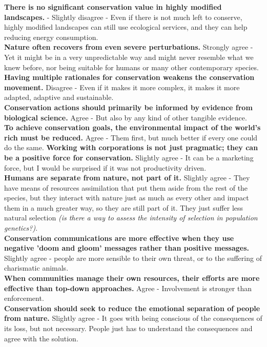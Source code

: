 \documentclass[12pt]{article}
\begin{document}
\textbf{There is no significant conservation value in highly modified landscapes.} - Slightly disagree - Even if there is not much left to conserve, highly modified landscapes can still use ecological services, and they can help reducing energy consumption.\\
\textbf{Nature often recovers from even severe perturbations.} Strongly agree - Yet it might be in a very unpredictable way and might never resemble what we knew before, nor being suitable for humans or many other contemporary species.\\
\textbf{Having multiple rationales for conservation weakens the conservation movement.} Disagree - Even if it makes it more complex, it makes it more adapted, adaptive and sustainable.\\
\textbf{Conservation actions should primarily be informed by evidence from biological science.} Agree - But also by any kind of other tangible evidence.\\
\textbf{To achieve conservation goals, the environmental impact of the world's rich must be reduced.} Agree - Them first, but much better if every one could do the same.
\textbf{Working with corporations is not just pragmatic; they can be a positive force for conservation.} Slightly agree - It can be a marketing force, but I would be surprised if it was not productivity driven.\\
\textbf{Humans are separate from nature, not part of it.} Slightly agree - They have means of resources assimilation that put them aside from the rest of the species, but they interact with nature just as much as every other and impact them in a much greater way, so they are still part of it. They just suffer less natural selection \textit{(is there a way to assess the intensity of selection in population genetics?)}.\\
\textbf{Conservation communications are more effective when they use negative 'doom and gloom' messages rather than positive messages.} Slightly agree - people are more sensible to their own threat, or to the suffering of charismatic animals.\\
\textbf{When communities manage their own resources, their efforts are more effective than top-down approaches.} Agree - Involvement is stronger than enforcement.\\
\textbf{Conservation should seek to reduce the emotional separation of people from nature.} Slightly agree - It goes with being conscious of the consequences of its loss, but not necessary. People just has to understand the consequences and agree with the solution.\\
\end{document}
